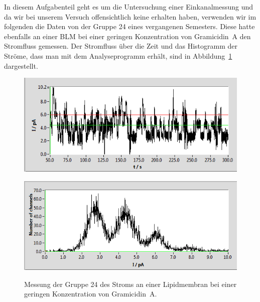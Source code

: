 \documentclass[a4paper,ngerman]{scrartcl}
\begin{document}
In diesem Aufgabenteil geht es um die Untersuchung einer Einkanalmessung und da wir bei unserem Versuch offensichtlich keine erhalten haben,
verwenden wir im folgenden die Daten von der Gruppe 24 eines vergangenen Semesters. Diese hatte ebenfalls an einer BLM bei einer geringen 
Konzentration von Gramicidin~A den Stromfluss gemessen. Der Stromfluss über die Zeit und das Histogramm der Ströme, dass man mit dem
Analyseprogramm erhält, sind in Abbildung~\ref{fig:einkanal_gr24} dargestellt.\\
\begin{figure}[tbh!]
  \centering
  \begin{minipage}[b]{.7\textwidth}
    \includegraphics[width=1.\textwidth]{abbildungen/einkanal_gruppe24_raw.png}
    \label{fig:einkanal_gr24_roh}
  \end{minipage}
  \begin{minipage}[b]{.7\textwidth}
    \includegraphics[width=1.\textwidth]{abbildungen/einkanal_gruppe24_hist.png}
    \label{fig:einkanal_gr24_hist}
  \end{minipage}
\caption{Messung der Gruppe 24 des Stroms an einer Lipidmembran bei einer geringen Konzentration von Gramicidin~A.}
\label{fig:einkanal_gr24}
\end{figure}
\end{document}

